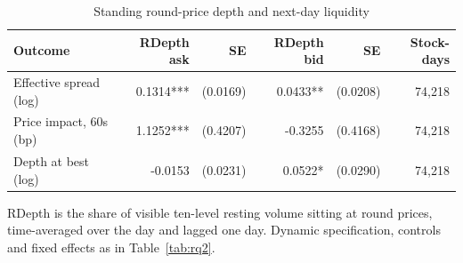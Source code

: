 \begin{table}[htbp]
\centering
\caption{Standing round-price depth and next-day liquidity}
\label{tab:rdepth}
\small
\begin{threeparttable}
\begin{tabular}{@{}lrrrrr@{}}
\toprule
Outcome & RDepth ask & SE & RDepth bid & SE & Stock-days \\
\midrule
Effective spread (log) & 0.1314*** & (0.0169) & 0.0433** & (0.0208) & 74,218 \\
Price impact, 60s (bp) & 1.1252*** & (0.4207) & -0.3255 & (0.4168) & 74,218 \\
Depth at best (log) & -0.0153 & (0.0231) & 0.0522* & (0.0290) & 74,218 \\
\bottomrule
\end{tabular}
\begin{tablenotes}[flushleft]\footnotesize
\item RDepth is the share of visible ten-level resting volume sitting at round prices, time-averaged over the day and lagged one day. Dynamic specification, controls and fixed effects as in Table~\ref{tab:rq2}.
\end{tablenotes}
\end{threeparttable}
\end{table}
